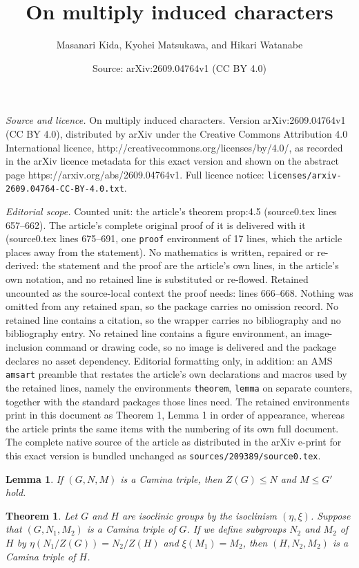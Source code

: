 \documentclass[10pt,a4paper]{amsart}
\title{On multiply induced characters}
\author{Masanari Kida, Kyohei Matsukawa, and Hikari Watanabe}
\date{Source: arXiv:2609.04764v1 (CC BY 4.0)}
\newtheorem{theorem}{Theorem}
\newtheorem{lemma}{Lemma}
\begin{document}
\maketitle

\noindent\emph{Source and licence.} On multiply induced characters. Version arXiv:2609.04764v1 (CC BY 4.0), distributed by arXiv under the Creative Commons Attribution 4.0 International licence, http://creativecommons.org/licenses/by/4.0/, as recorded in the arXiv licence metadata for this exact version and shown on the abstract page https://arxiv.org/abs/2609.04764v1. Full licence notice: \texttt{licenses/arxiv-2609.04764-CC-BY-4.0.txt}.\par\smallskip

\noindent\textit{Editorial scope.} Counted unit: the article's theorem prop:4.5 (source0.tex lines 657--662). The article's complete original proof of it is delivered with it (source0.tex lines 675--691, one \texttt{proof} environment of 17 lines, which the article places away from the statement). No mathematics is written, repaired or re-derived: the statement and the proof are the article's own lines, in the article's own notation, and no retained line is substituted or re-flowed.  Retained uncounted as the source-local context the proof needs: lines 666--668.  Nothing was omitted from any retained span, so the package carries no omission record.  No retained line contains a citation, so the wrapper carries no bibliography and no bibliography entry.  No retained line contains a figure environment, an image-inclusion command or drawing code, so no image is delivered and the package declares no asset dependency.  Editorial formatting only, in addition: an AMS \texttt{amsart} preamble that restates the article's own declarations and macros used by the retained lines, namely the environments \texttt{theorem}, \texttt{lemma} on separate counters, together with the standard packages those lines need.  The retained environments print in this document as Theorem 1, Lemma 1 in order of appearance, whereas the article prints the same items with the numbering of its own full document.  The complete native source of the article as distributed in the arXiv e-print for this exact version is bundled unchanged as \texttt{sources/209389/source0.tex}.
\begin{lemma} \label{lem:4.5}
If $(G,N,M)$ is a Camina triple, then $Z (G) \le N$ and $M \le G'$ hold.
\end{lemma}

\begin{theorem}  \label{prop:4.5}
Let $G$ and $H$ are isoclinic groups by the isoclinism $(\eta, \xi )$.
Suppose that $(G,N_1,M_2)$ is a Camina triple of $G$. If we define subgroups $N_2$ and $M_2$ of $H$ by
$\eta (N_1/Z (G)) = N_2 /Z (H)$ and $ \xi (M_1) = M_2$, then $(H,N_2, M_2)$ is a Camina triple 
of $H$.
\end{theorem}
\end{document}
